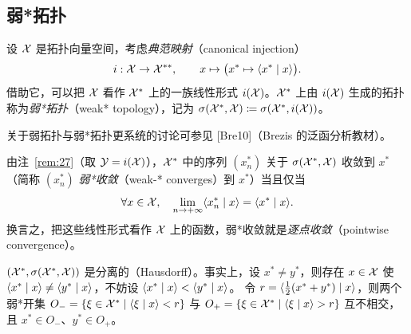 \subsection{弱*拓扑}

\begin{definition}[弱*拓扑]
\label{def:39}
设 $\mathcal{X}$ 是拓扑向量空间，考虑\emph{典范映射}（canonical injection）
\[
  i:\mathcal{X}\to\mathcal{X}^{**},\qquad x\mapsto\bigl(x^*\mapsto\langle x^* \mid x\rangle\bigr).
\]
借助它，可以把 $\mathcal{X}$ 看作 $\mathcal{X}^{*}$ 上的一族线性形式 $i(\mathcal{X})$。$\mathcal{X}^{*}$ 上由 $i(\mathcal{X})$ 生成的拓扑称为\emph{弱*拓扑}（weak* topology），记为
$\sigma(\mathcal{X}^{*},\mathcal{X})\coloneqq\sigma(\mathcal{X}^{*},i(\mathcal{X}))$。
\end{definition}

关于弱拓扑与弱*拓扑更系统的讨论可参见 [Bre10]（Brezis 的泛函分析教材）。

\begin{remark}[弱*收敛与逐点收敛]
\label{rem:29}
由注~\ref{rem:27}（取 $\mathcal{Y}=i(\mathcal{X})$），$\mathcal{X}^{*}$ 中的序列 $(x^*_n)$ 关于 $\sigma(\mathcal{X}^{*},\mathcal{X})$ 收敛到 $x^*$（简称 $(x^*_n)$ \emph{弱*收敛}（weak-* converges）到 $x^*$）当且仅当
\[
  \forall x\in\mathcal{X},\quad\lim_{n\to+\infty}\langle x^*_n \mid x\rangle=\langle x^* \mid x\rangle.
\]
换言之，把这些线性形式看作 $\mathcal{X}$ 上的函数，弱*收敛就是\emph{逐点收敛}（pointwise convergence）。
\end{remark}

\begin{remark}[分离性]
\label{rem:30}
$(\mathcal{X}^{*},\sigma(\mathcal{X}^{*},\mathcal{X}))$ 是分离的（Hausdorff）。事实上，设 $x^*\neq y^*$，则存在 $x\in\mathcal{X}$ 使 $\langle x^* \mid x\rangle\neq\langle y^* \mid x\rangle$，不妨设 $\langle x^* \mid x\rangle<\langle y^* \mid x\rangle$。
令 $r=\langle \tfrac12(x^*+y^*) \mid x\rangle$，则两个弱*开集 $O_-=\{\xi\in\mathcal{X}^{*}\mid\langle \xi \mid x\rangle<r\}$ 与 $O_+=\{\xi\in\mathcal{X}^{*}\mid\langle \xi \mid x\rangle>r\}$ 互不相交，且 $x^*\in O_-$、$y^*\in O_+$。
\end{remark}

